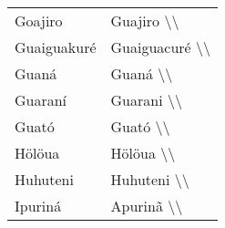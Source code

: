 \begin{table}[]
\begin{tabular}{|l|l|}
Goajiro                    & Guajiro \textbackslash{}\textbackslash{}       \\
Guaiguakuré                & Guaiguacuré \textbackslash{}\textbackslash{}   \\
Guaná                      & Guaná \textbackslash{}\textbackslash{}         \\
Guaraní                    & Guarani \textbackslash{}\textbackslash{}       \\
Guató                      & Guató \textbackslash{}\textbackslash{}         \\
Hölöua                     & Hölöua \textbackslash{}\textbackslash{}        \\
Huhuteni                   & Huhuteni \textbackslash{}\textbackslash{}      \\
Ipuriná                    & Apurinã \textbackslash{}\textbackslash{}      
\end{tabular}
\end{table}

